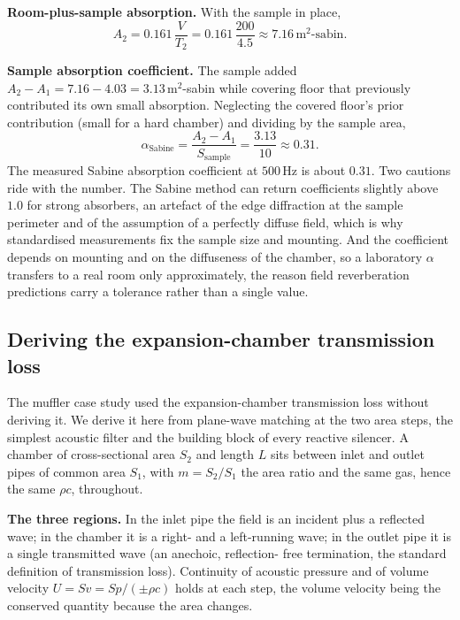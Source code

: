 \textbf{Room-plus-sample absorption.} With the sample in place,
\[
A_2 = 0.161\,\frac{V}{T_2} = 0.161\,\frac{200}{4.5}
    \approx 7.16\,\si{\meter\squared}\text{-sabin}.
\]

\textbf{Sample absorption coefficient.} The sample added
$A_2-A_1 = 7.16-4.03 = 3.13\,\si{\meter\squared}$-sabin while covering
floor that previously contributed its own small absorption. Neglecting the
covered floor's prior contribution (small for a hard chamber) and dividing
by the sample area,
\[
\alpha_{\text{Sabine}} = \frac{A_2 - A_1}{S_{\text{sample}}}
                       = \frac{3.13}{10} \approx 0.31 .
\]
The measured Sabine absorption coefficient at $500\,\si{\hertz}$ is about
$0.31$. Two cautions ride with the number. The Sabine method can return
coefficients slightly above $1.0$ for strong absorbers, an artefact of the
edge diffraction at the sample perimeter and of the assumption of a
perfectly diffuse field, which is why standardised measurements fix the
sample size and mounting. And the coefficient depends on mounting and on
the diffuseness of the chamber, so a laboratory $\alpha$ transfers to a
real room only approximately, the reason field reverberation predictions
carry a tolerance rather than a single value.

\subsection{Deriving the expansion-chamber transmission loss}

The muffler case study used the expansion-chamber transmission loss without
deriving it. We derive it here from plane-wave matching at the two area
steps, the simplest acoustic filter and the building block of every
reactive silencer. A chamber of cross-sectional area $S_2$ and length $L$
sits between inlet and outlet pipes of common area $S_1$, with $m=S_2/S_1$
the area ratio and the same gas, hence the same $\rho c$, throughout.

\textbf{The three regions.} In the inlet pipe the field is an incident plus
a reflected wave; in the chamber it is a right- and a left-running wave; in
the outlet pipe it is a single transmitted wave (an anechoic, reflection-
free termination, the standard definition of transmission loss). Continuity
of acoustic pressure and of volume velocity $U=Sv=Sp/(\pm\rho c)$ holds at
each step, the volume velocity being the conserved quantity because the area
changes.

